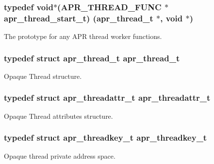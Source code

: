 \subsubsection[{\texorpdfstring{apr\+\_\+thread\+\_\+start\+\_\+t}{apr_thread_start_t}}]{\setlength{\rightskip}{0pt plus 5cm}typedef {\bf void}$\ast$({\bf A\+P\+R\+\_\+\+T\+H\+R\+E\+A\+D\+\_\+\+F\+U\+NC} $\ast$ apr\+\_\+thread\+\_\+start\+\_\+t) ({\bf apr\+\_\+thread\+\_\+t} $\ast$, {\bf void} $\ast$)}\hypertarget{group__apr__thread__proc_gaa1f88d2a6fe971ac200e466cae5f63e0}{}\label{group__apr__thread__proc_gaa1f88d2a6fe971ac200e466cae5f63e0}
The prototype for any A\+PR thread worker functions. 
\subsubsection[{\texorpdfstring{apr\+\_\+thread\+\_\+t}{apr_thread_t}}]{\setlength{\rightskip}{0pt plus 5cm}typedef struct {\bf apr\+\_\+thread\+\_\+t} {\bf apr\+\_\+thread\+\_\+t}}\hypertarget{group__apr__thread__proc_ga646c71351e723d84f8cc8c8d1d5937be}{}\label{group__apr__thread__proc_ga646c71351e723d84f8cc8c8d1d5937be}
Opaque Thread structure. 
\subsubsection[{\texorpdfstring{apr\+\_\+threadattr\+\_\+t}{apr_threadattr_t}}]{\setlength{\rightskip}{0pt plus 5cm}typedef struct {\bf apr\+\_\+threadattr\+\_\+t} {\bf apr\+\_\+threadattr\+\_\+t}}\hypertarget{group__apr__thread__proc_ga35de571e9944871c10b38d8feef885ac}{}\label{group__apr__thread__proc_ga35de571e9944871c10b38d8feef885ac}
Opaque Thread attributes structure. 
\subsubsection[{\texorpdfstring{apr\+\_\+threadkey\+\_\+t}{apr_threadkey_t}}]{\setlength{\rightskip}{0pt plus 5cm}typedef struct {\bf apr\+\_\+threadkey\+\_\+t} {\bf apr\+\_\+threadkey\+\_\+t}}\hypertarget{group__apr__thread__proc_ga337c9c1bd2d47740022071a5c41f2edb}{}\label{group__apr__thread__proc_ga337c9c1bd2d47740022071a5c41f2edb}
Opaque thread private address space. 

